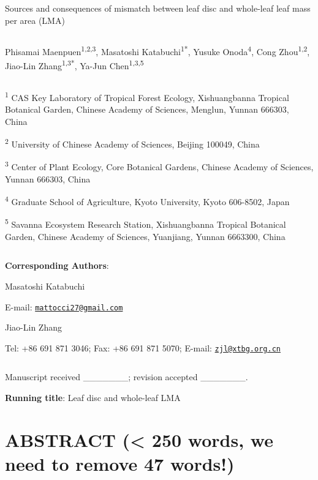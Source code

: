 \documentclass[
  12pt,
  a4paper,
,tablecaptionabove
]{scrartcl}
\date{}
\title{}
\author{}
\providecommand{\DIFaddbegin}{} %
\providecommand{\DIFaddend}{} %
\providecommand{\DIFdelbegin}{} %
\providecommand{\DIFdelend}{} %
\newcommand{\DIFscaledelfig}{0.5}
\newlength{\DIFdelgraphicswidth} %
\newlength{\DIFdelgraphicsheight} %
\newcommand{\DIFaddincludegraphics}[2][]{{\color{blue}\fbox{\DIFOincludegraphics[#1]{#2}}}} %
\newcommand{\DIFdelincludegraphics}[2][]{%
\sbox{\DIFdelgraphicsbox}{\DIFOincludegraphics[#1]{#2}}%
\settoboxwidth{\DIFdelgraphicswidth}{\DIFdelgraphicsbox} %
\settoboxtotalheight{\DIFdelgraphicsheight}{\DIFdelgraphicsbox} %
\scalebox{\DIFscaledelfig}{%
\parbox[b]{\DIFdelgraphicswidth}{\usebox{\DIFdelgraphicsbox}\\[-\baselineskip] \rule{\DIFdelgraphicswidth}{0em}}\llap{\resizebox{\DIFdelgraphicswidth}{\DIFdelgraphicsheight}{%
\setlength{\unitlength}{\DIFdelgraphicswidth}%
\begin{picture}(1,1)%
\thicklines\linethickness{2pt} %
{\color[rgb]{1,0,0}\put(0,0){\framebox(1,1){}}}%
{\color[rgb]{1,0,0}\put(0,0){\line( 1,1){1}}}%
{\color[rgb]{1,0,0}\put(0,1){\line(1,-1){1}}}%
\end{picture}%
}\hspace*{3pt}}} %
} %
\DeclareRobustCommand{\DIFaddbegin}{\DIFOaddbegin \let\includegraphics\DIFaddincludegraphics} %
\DeclareRobustCommand{\DIFaddend}{\DIFOaddend \let\includegraphics\DIFOincludegraphics} %
\DeclareRobustCommand{\DIFdelbegin}{\DIFOdelbegin \let\includegraphics\DIFdelincludegraphics} %
\DeclareRobustCommand{\DIFdelend}{\DIFOaddend \let\includegraphics\DIFOincludegraphics} %
\begin{document}




Sources and consequences of mismatch between leaf disc and whole-leaf leaf mass per area (LMA)

\[ \]

Phisamai Maenpuen\textsuperscript{1,2,3},
Masatoshi Katabuchi\textsuperscript{1*},
Yusuke Onoda\textsuperscript{4},
Cong Zhou\textsuperscript{1,2},
Jiao-Lin Zhang\textsuperscript{1,3*},
Ya-Jun Chen\textsuperscript{1,3,5}

\[ \]

\textsuperscript{1} CAS Key Laboratory of Tropical Forest Ecology, Xishuangbanna Tropical Botanical Garden, Chinese Academy of Sciences, Menglun, Yunnan 666303, China

\textsuperscript{2} University of Chinese Academy of Sciences, Beijing 100049, China

\textsuperscript{3} Center of Plant Ecology, Core Botanical Gardens, Chinese Academy of Sciences, Yunnan 666303, China

\textsuperscript{4} Graduate School of Agriculture, Kyoto University, Kyoto 606-8502, Japan

\textsuperscript{5} Savanna Ecosystem Research Station, Xishuangbanna Tropical Botanical Garden, Chinese Academy of Sciences, Yuanjiang, Yunnan 6663300, China

\[ \]

\textbf{Corresponding Authors}:

Masatoshi Katabuchi

E-mail: \href{mailto:mattocci27@gmail.com}{\nolinkurl{mattocci27@gmail.com}}

Jiao-Lin Zhang

Tel: +86 691 871 3046;
Fax: +86 691 871 5070;
E-mail: \href{mailto:zjl@xtbg.org.cn}{\nolinkurl{zjl@xtbg.org.cn}}

\[ \]

Manuscript received \_\_\_\_\_\_\_; revision accepted \_\_\_\_\_\_\_.

\textbf{Running title}: Leaf disc and whole-leaf LMA

\newpage

\DIFdelbegin %
\DIFdelend \DIFaddbegin \hypertarget{abstract-250-words-we-need-to-remove-47-words}{%
\section{ABSTRACT (\textless{} 250 words, we need to remove 47 words!)}\label{abstract-250-words-we-need-to-remove-47-words}}
\DIFaddend 
\end{document}
